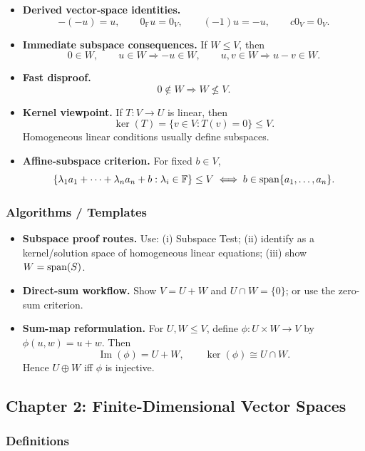 \begin{itemize}[leftmargin=*]
\item \textbf{Derived vector-space identities.}
\[
-(-u)=u,
\qquad
0_{\mathbb F}u=0_V,
\qquad
(-1)u=-u,
\qquad
c0_V=0_V.
\]

\item \textbf{Immediate subspace consequences.} If $W\le V$, then
\[
0\in W,
\qquad
u\in W\Rightarrow -u\in W,
\qquad
u,v\in W\Rightarrow u-v\in W.
\]

\item \textbf{Fast disproof.}
\[
0\notin W\Rightarrow W\not\le V.
\]

\item \textbf{Kernel viewpoint.} If $T:V\to U$ is linear, then
\[
\ker(T)=\{v\in V:T(v)=0\}\le V.
\]
Homogeneous linear conditions usually define subspaces.

\item \textbf{Affine-subspace criterion.} For fixed $b\in V$,
\[
\{\lambda_1a_1+\cdots+\lambda_n a_n+b:\lambda_i\in\mathbb F\}\le V
\iff
b\in\operatorname{span}\{a_1,\dots,a_n\}.
\]
\end{itemize}

\subsubsection*{Algorithms / Templates}

\begin{itemize}[leftmargin=*]
\item \textbf{Subspace proof routes.} Use: (i) Subspace Test; (ii) identify as a kernel/solution space of homogeneous linear equations; (iii) show $W=\operatorname{span}(S)$.

\item \textbf{Direct-sum workflow.} Show $V=U+W$ and $U\cap W=\{0\}$; or use the zero-sum criterion.

\item \textbf{Sum-map reformulation.} For $U,W\le V$, define $\phi:U\times W\to V$ by $\phi(u,w)=u+w$.
Then
\[
\operatorname{Im}(\phi)=U+W,
\qquad
\ker(\phi)\cong U\cap W.
\]
Hence $U\oplus W$ iff $\phi$ is injective.
\end{itemize}

\subsection*{Chapter 2: Finite-Dimensional Vector Spaces}

\subsubsection*{Definitions}

